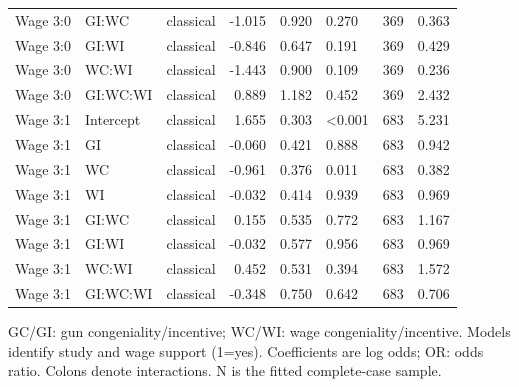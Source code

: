 \begin{longtable}[t]{lllrrlrr}
Wage 3:0 & GI:WC & classical & -1.015 & 0.920 & 0.270 & 369 & 0.363\\
Wage 3:0 & GI:WI & classical & -0.846 & 0.647 & 0.191 & 369 & 0.429\\
Wage 3:0 & WC:WI & classical & -1.443 & 0.900 & 0.109 & 369 & 0.236\\
Wage 3:0 & GI:WC:WI & classical & 0.889 & 1.182 & 0.452 & 369 & 2.432\\
Wage 3:1 & Intercept & classical & 1.655 & 0.303 & <0.001 & 683 & 5.231\\
Wage 3:1 & GI & classical & -0.060 & 0.421 & 0.888 & 683 & 0.942\\
Wage 3:1 & WC & classical & -0.961 & 0.376 & 0.011 & 683 & 0.382\\
Wage 3:1 & WI & classical & -0.032 & 0.414 & 0.939 & 683 & 0.969\\
Wage 3:1 & GI:WC & classical & 0.155 & 0.535 & 0.772 & 683 & 1.167\\
Wage 3:1 & GI:WI & classical & -0.032 & 0.577 & 0.956 & 683 & 0.969\\
Wage 3:1 & WC:WI & classical & 0.452 & 0.531 & 0.394 & 683 & 1.572\\
Wage 3:1 & GI:WC:WI & classical & -0.348 & 0.750 & 0.642 & 683 & 0.706\\
\bottomrule
\end{longtable}
\noindent\footnotesize GC/GI: gun congeniality/incentive; WC/WI: wage congeniality/incentive. Models identify study and wage support (1=yes). Coefficients are log odds; OR: odds ratio. Colons denote interactions. N is the fitted complete-case sample.\par\normalsize
